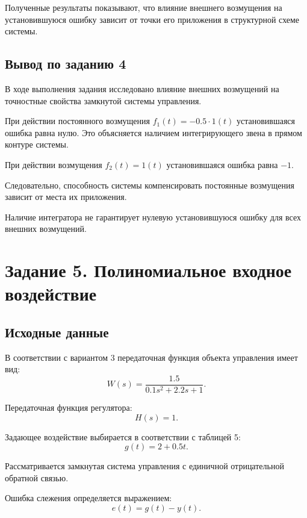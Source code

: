 \documentclass[12pt, a4paper]{article}
\begin{document}
Полученные результаты показывают,
что влияние внешнего возмущения
на установившуюся ошибку зависит
от точки его приложения
в структурной схеме системы.


\subsection{Вывод по заданию 4}

В ходе выполнения задания исследовано
влияние внешних возмущений на точностные
свойства замкнутой системы управления.

При действии постоянного возмущения
$f_1(t)=-0.5\cdot1(t)$ установившаяся
ошибка равна нулю. Это объясняется
наличием интегрирующего звена
в прямом контуре системы.

При действии возмущения
$f_2(t)=1(t)$ установившаяся
ошибка равна $-1$.

Следовательно, способность системы
компенсировать постоянные возмущения
зависит от места их приложения.

Наличие интегратора не гарантирует
нулевую установившуюся ошибку
для всех внешних возмущений.




\newpage
\section{Задание 5. Полиномиальное входное воздействие}

\subsection{Исходные данные}

В соответствии с вариантом 3 передаточная
функция объекта управления имеет вид:
\[
    W(s)=\frac{1.5}{0.1s^2+2.2s+1}.
\]

Передаточная функция регулятора:
\[
    H(s)=1.
\]

Задающее воздействие выбирается
в соответствии с таблицей 5:
\begin{equation}
    \boxed{g(t)=2+0.5t}.
\end{equation}

Рассматривается замкнутая система управления
с единичной отрицательной обратной связью.

Ошибка слежения определяется выражением:
\[
    e(t)=g(t)-y(t).
\]
\end{document}
